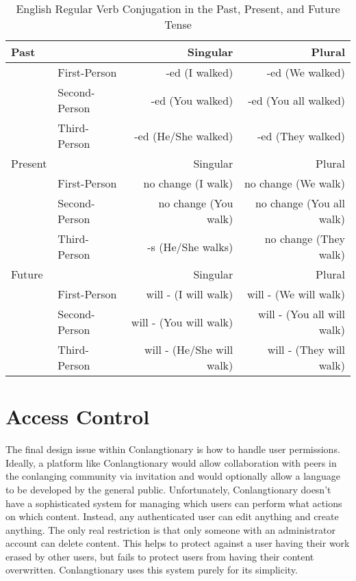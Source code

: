 \begin{table}
    \centering
    \caption{English Regular Verb Conjugation in the Past, Present, and Future Tense}
    \label{tbl:english-conjugation}
    \begin{tabular}{|ll||*{2}{r}||}
        \hline
        Past & & Singular & Plural \\ \hline \hline
          & First-Person & -ed (I walked) & -ed (We walked) \\ \hline
          & Second-Person & -ed (You walked) & -ed (You all walked) \\ \hline
          & Third-Person & -ed (He/She walked) & -ed (They walked) \\ \hline \hline
        Present & & Singular & Plural \\ \hline \hline
          & First-Person & no change (I walk) & no change (We walk) \\ \hline
          & Second-Person & no change (You walk) & no change (You all walk) \\ \hline
          & Third-Person & -s (He/She walks) & no change (They walk) \\ \hline \hline
        Future & & Singular & Plural \\ \hline \hline
          & First-Person & will - (I will walk) & will - (We will walk) \\ \hline
          & Second-Person & will - (You will walk) & will - (You all will walk) \\ \hline
          & Third-Person & will - (He/She will walk) & will - (They will walk) \\ \hline
    \end{tabular}
\end{table}

\section{Access Control}
\label{sec:access-control}

The final design issue within Conlangtionary is how to handle user permissions. Ideally, a platform like Conlangtionary would allow collaboration with peers in the conlanging community via invitation and would optionally allow a language to be developed by the general public. Unfortunately, Conlangtionary doesn't have a sophisticated system for managing which users can perform what actions on which content. Instead, any authenticated user can edit anything and create anything. The only real restriction is that only someone with an administrator account can delete content. This helps to protect against a user having their work erased by other users, but fails to protect users from having their content overwritten. Conlangtionary uses this system purely for its simplicity.